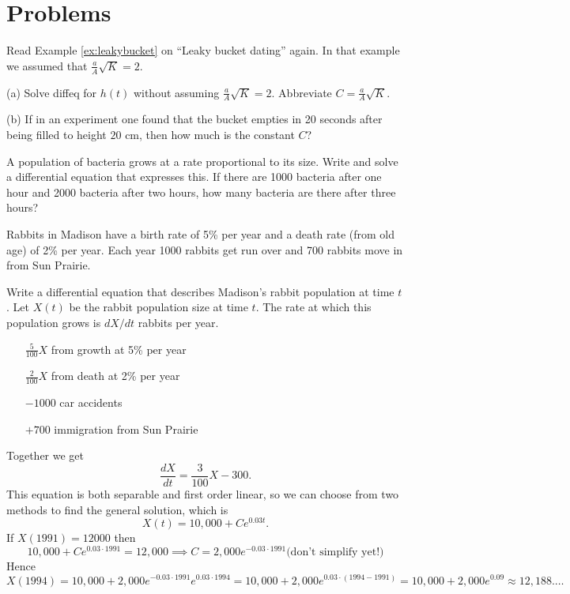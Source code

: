\section{Problems} %
\problemfont %
\begin{multicols}{2}

\problem Read Example \ref{ex:leakybucket} on ``Leaky bucket dating'' %
again.  In that example we assumed that $\frac aA\sqrt K = 2$.

(a) Solve diffeq for $h(t)$ without assuming $\frac aA\sqrt K = 2$.
Abbreviate $C=\frac aA\sqrt K $.

(b) If in an experiment one found that the bucket empties in 20 seconds
after being filled to height $20$ cm, then how much is the constant
$C$?

\problem A population of bacteria grows at a rate proportional to its %
size. Write and solve a differential equation that expresses this. If
there are 1000 bacteria after one hour and 2000 bacteria after two hours,
how many bacteria are there after three hours?

\problem Rabbits in Madison have a birth rate of 5\% per year and a death %
rate (from old age) of 2\% per year. Each year 1000 rabbits get run over
and 700 rabbits move in from Sun Prairie.

\subprob Write a differential equation that describes Madison's rabbit
population at time $t$.
\answer %
Let $X(t)$ be the rabbit population size at time $t$.  The rate at which
this population grows is $dX/dt$ rabbits per year.
\begin{itemize}
\item [$\frac{5}{100}X$] from growth at 5\% per year
\item [$\frac{2}{100}X$] from death at 2\% per year
\item [$-1000$] car accidents
\item [$+700$] immigration from Sun Prairie
\end{itemize}
Together we get
\[
\frac{dX}{dt} = \frac{3}{100}X - 300.
\]
This equation is both separable and first order linear, so we can choose
from two methods to find the general solution, which is
\[
X(t) = 10,000 + C e^{0.03 t}.
\]
If $X(1991) = 12000$ then
\[
10,000 + C e^{0.03\cdot 1991} = 12,000 \implies C = 2,000e^{-0.03\cdot
1991} \text{(don't simplify yet!)}
\]
Hence
\[
X(1994) = 10,000 + 2,000e^{-0.03\cdot 1991}e^{0.03\cdot 1994} =10,000 +
2,000e^{0.03\cdot (1994-1991)} =10,000 + 2,000e^{0.09} \approx
12,188.\ldots
\]
\endanswer


\end{multicols}
